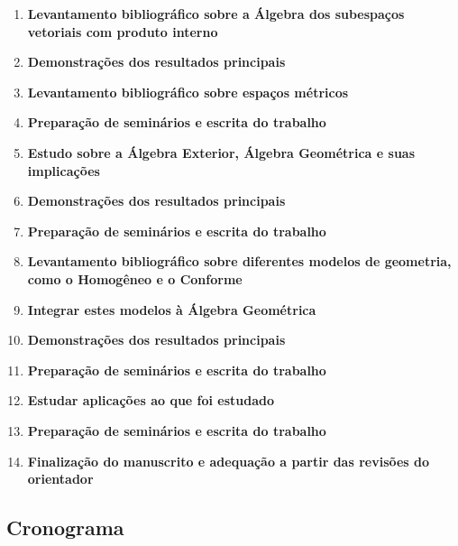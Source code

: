 \documentclass[11pt]{article}
\begin{document}
	\begin{enumerate}[(1)]
		
	\item \textbf{Levantamento bibliográfico sobre a Álgebra dos subespaços vetoriais com produto interno}
	
	\item \textbf{Demonstrações dos resultados principais}
	
	\item \textbf{Levantamento bibliográfico sobre espaços métricos}
	
	\item \textbf{Preparação de seminários e escrita do trabalho}
	
	\item \textbf{Estudo sobre a Álgebra Exterior, Álgebra Geométrica e suas implicações}
	
	\item \textbf{Demonstrações dos resultados principais}
	
	\item \textbf{Preparação de seminários e escrita do trabalho}
	
	\item \textbf{Levantamento bibliográfico sobre diferentes modelos de geometria, como o Homogêneo e o Conforme}
	
	\item \textbf{Integrar estes modelos à Álgebra Geométrica}
	
	\item \textbf{Demonstrações dos resultados principais}
	
	\item \textbf{Preparação de seminários e escrita do trabalho}
	
	\item \textbf{Estudar aplicações ao que foi estudado}
	
	\item \textbf{Preparação de seminários e escrita do trabalho}
	
	\item \textbf{Finalização do manuscrito e adequação a partir das revisões do orientador}
	
	\end{enumerate}
	
	
	\subsection{Cronograma}
	
\end{document}
